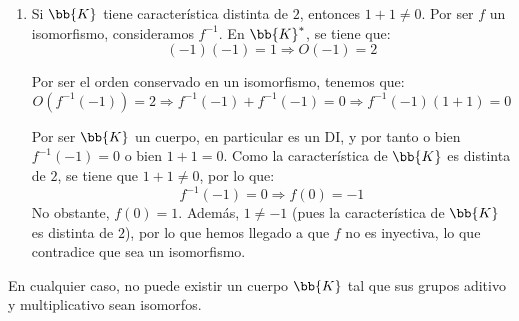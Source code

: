 \begin{ejercicio}
\begin{enumerate}
        \item Si $\bb{K}$ tiene característica distinta de $2$, entonces $1+1\neq 0$. Por ser $f$ un isomorfismo, consideramos $f^{-1}$. En $\bb{K}^*$, se tiene que:
        \begin{equation*}
            (-1)(-1)=1\Longrightarrow O(-1)=2
        \end{equation*}

        Por ser el orden conservado en un isomorfismo, tenemos que:
        \begin{equation*}
            O(f^{-1}(-1))=2\Longrightarrow f^{-1}(-1) + f^{-1}(-1) = 0
            \Longrightarrow f^{-1}(-1)\left(1+1\right)=0
        \end{equation*}

        Por ser $\bb{K}$ un cuerpo, en particular es un DI, y por tanto o bien $f^{-1}(-1)=0$ o bien $1+1=0$. Como la característica de $\bb{K}$ es distinta de $2$, se tiene que $1+1\neq 0$, por lo que:
        \begin{equation*}
            f^{-1}(-1)=0\Longrightarrow f(0)=-1
        \end{equation*}
        No obstante, $f(0)=1$. Además, $1\neq -1$ (pues la característica de $\bb{K}$ es distinta de $2$), por lo que hemos llegado a que $f$ no es inyectiva, lo que contradice que sea un isomorfismo.
    \end{enumerate}

    En cualquier caso, no puede existir un cuerpo $\bb{K}$ tal que sus grupos aditivo y multiplicativo sean isomorfos.    
\end{ejercicio}